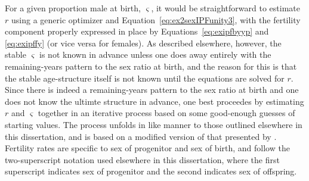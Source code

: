 \label{sec:rexIPFfindr}
For a given proportion male at birth, $\varsigma$, it would be straightforward
to estimate $r$ using a generic optimizer and
Equation~\eqref{eq:ex2sexIPFunity3}, with the fertility component properly
expressed in place by Equations~\eqref{eq:exipfbyyp} and \eqref{eq:exipffy} (or
vice versa for females). As described elsewhere, however, the stable $\varsigma$
is not known in advance unless one does away entirely with the remaining-years
pattern to the sex ratio at birth, and the reason for this is that the stable
age-structure itself is not known until the equations are solved for $r$.
Since there is indeed a remaining-years pattern to the sex ratio at birth and
one does not know the ultimte structure in advance, one best proceedes by
estimating $r$ and $\varsigma$ together in an iterative process based on some 
good-enough guesses of starting values. The process unfolds in like manner to 
those outlined elsewhere in this dissertation, and is based on a modified version 
of that presented by \citet{coale1957new}.
Fertility rates are specific to sex of progenitor and sex of birth, and follow
the two-superscript notation used elsewhere in this dissertation, where the
first superscript indicates sex of progenitor and the second indicates sex of
offspring.

